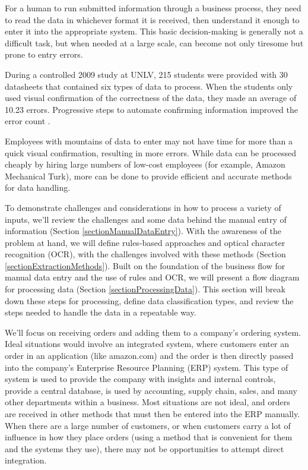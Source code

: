 \documentclass[conference]{IEEEtran}
\begin{document}
For a human to run submitted information through a business process, they need to read the data in whichever format it is received, then understand it enough to enter it into the appropriate system. This basic decision-making is generally not a difficult task, but when needed at a large scale, can become not only tiresome but prone to entry errors. 

During a controlled 2009 study at UNLV, 215 students were provided with 30 datasheets that contained six types of data to process. When the students only used visual confirmation of the correctness of the data, they made an average of 10.23 errors. Progressive steps to automate confirming information improved the error count \cite{harris2014when}.

Employees with mountains of data to enter may not have time for more than a quick visual confirmation, resulting in more errors. While data can be processed cheaply by hiring large numbers of low-cost employees (for example, Amazon Mechanical Turk), more can be done to provide efficient and accurate methods for data handling.

To demonstrate challenges and considerations in how to process a variety of inputs, we'll review the challenges and some data behind the manual entry of information (Section \ref{sectionManualDataEntry}). With the awareness of the problem at hand, we will define rules-based approaches and optical character recognition (OCR), with the challenges involved with these methods (Section \ref{sectionExtractionMethods}). Built on the foundation of the business flow for manual data entry and the use of rules and OCR, we will present a flow diagram for processing data (Section \ref{sectionProcessingData}). This section will break down these steps for processing, define data classification types, and review the steps needed to handle the data in a repeatable way.

We'll focus on receiving orders and adding them to a company's ordering system. Ideal situations would involve an integrated system, where customers enter an order in an application (like amazon.com) and the order is then directly passed into the company's Enterprise Resource Planning (ERP) system. This type of system is used to provide the company with insights and internal controls, provide a central database, is used by accounting, supply chain, sales, and many other departments within a business. Most situations are not ideal, and orders are received in other methods that must then be entered into the ERP manually. When there are a large number of customers, or when customers carry a lot of influence in how they place orders (using a method that is convenient for them and the systems they use), there may not be opportunities to attempt direct integration.
\end{document}

